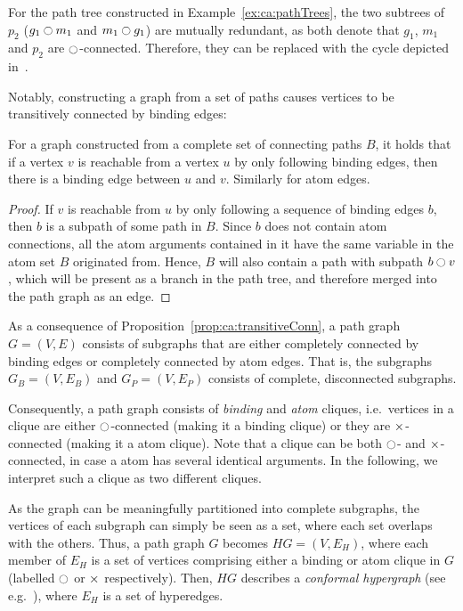 \documentclass[\master/Master.tex]{subfiles}
\begin{document}
\begin{example}\label{ex:ca:pathGraph}
    For the path tree constructed in Example~\ref{ex:ca:pathTrees}, the two subtrees of $p_2$ ($g_1 \ocircle m_1$ and $m_1 \ocircle g_1$) are mutually redundant, as both denote that $g_1$, $m_1$ and $p_2$ are $\ocircle$-connected. Therefore, they can be replaced with the cycle depicted in~. 
\end{example}

Notably, constructing a graph from a set of paths causes vertices to be transitively connected by binding edges:

\begin{proposition}\label{prop:ca:transitiveConn}
    For a graph constructed from a complete set of connecting paths $B$, it holds that if a vertex $v$ is reachable from a vertex $u$ by only following binding edges, then there is a binding edge between $u$ and $v$. Similarly for atom edges.
\end{proposition}

\begin{proof}
   If $v$ is reachable from $u$ by only following a sequence of binding edges $b$, then $b$ is a subpath of some path in $B$. Since $b$ does not contain atom connections, all the atom arguments contained in it have the same variable in the atom set $B$ originated from. Hence, $B$ will also contain a path with subpath $b \ocircle v$, which will be present as a branch in the path tree, and therefore merged into the path graph as an edge.
\end{proof}

As a consequence of Proposition~\ref{prop:ca:transitiveConn}, a path graph $G = (V,E)$ consists of subgraphs that are either completely connected by binding edges or completely connected by atom edges. That is, the subgraphs $G_B = \left(V, E_B \right)$ and $G_P = \left( V, E_P \right)$ consists of complete, disconnected subgraphs.

Consequently, a path graph consists of \textit{binding} and \textit{atom} cliques, i.e.\ vertices in a clique are either $\ocircle$-connected (making it a binding clique) or they are $\times$-connected (making it a atom clique). Note that a clique can be both $\ocircle$- and $\times$-connected, in case a atom has several identical arguments. In the following, we interpret such a clique as two different cliques.

As the graph can be meaningfully partitioned into complete subgraphs, the vertices of each subgraph can simply be seen as a set, where each set overlaps with the others. Thus, a path graph $G$ becomes $HG = \left(V, E_H\right)$, where each member of $E_H$ is a set of vertices comprising either a binding or atom clique in $G$ (labelled $\ocircle$ or $\times$ respectively). Then, $HG$ describes a \emph{conformal hypergraph} (see e.g.\ \cite{bretto}), where $E_H$ is a set of hyperedges.
\end{document}
